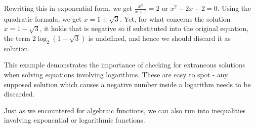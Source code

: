 \begin{example}
\begin{enumerate}
Rewriting this in exponential form, we get $ \frac{x^{2}}{x+1} = 2$ or $x^2 -2x-2 = 0$.  Using the quadratic formula, we get $x = 1 \pm \sqrt{3}$. Yet, for what concerns the solution $x = 1 - \sqrt{3}$, it holds that is negative so if substituted into the original equation, the term $2 \log_{2}\left(1 - \sqrt{3}\right)$ is undefined, and hence we should discard it as solution.

\end{enumerate}


\end{example}


This example demonstrates the importance of checking for extraneous solutions when solving equations involving logarithms.  These are easy to spot - any supposed solution which causes a negative number inside a logarithm needs to be discarded.  


Just as we encountered for algebraic functions, we can also run into inequalities involving exponential or logarithmic functions.

